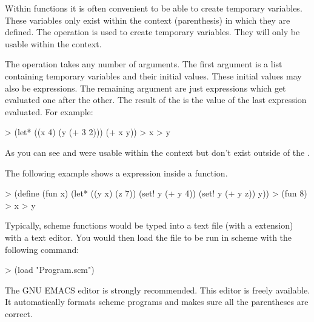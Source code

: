Within functions it is often convenient to be able to create temporary
variables.  These variables only exist within the context
(parenthesis) in which they are defined.  The operation  is used
to create temporary variables.  They will only be usable within the
 context.

The  operation takes any number of arguments.  The first argument
is a list containing temporary variables and their initial values.
These initial values may also be expressions.  The remaining argument
are just expressions which get evaluated one after the other.  The
result of the  is the value of the last expression evaluated.  For
example:


\begcode
> (let* ((x 4)
         (y (+ 3 2)))
        (+ x y))
> x
> y
\endcode


As you can see  and  were usable within the 
context but don't exist outside of the .

The following example shows a  expression inside a function.


\begcode
> (define (fun x)
          (let* ((y x)
                 (z 7))
                (set! y (+ y 4))
                (set! y (+ y z))
                y))
> (fun 8)
> x
> y
\endcode


Typically, scheme functions would be typed into a text file (with a
 extension) with a text editor.  You would then load the file to
be run in scheme with the following command:

\begcode
>  (load "Program.scm")
\endcode

The GNU EMACS editor is strongly recommended.  This editor is freely
available.  It automatically formats scheme programs and makes sure
all the parentheses are correct.

\bye
